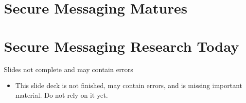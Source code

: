 \documentclass[aspectratio=169, lualatex, handout]{beamer}
\begin{document}
\section{Secure Messaging Matures}

\section{Secure Messaging Research Today}


\begin{frame}{Slides not complete and may contain errors}
	\begin{itemize}
		\item This slide deck is not finished, may contain errors, and is missing important material. Do not rely on it yet.
	\end{itemize}
\end{frame}

\begin{frame}[plain]
	\titlepage
\end{frame}
\end{document}
